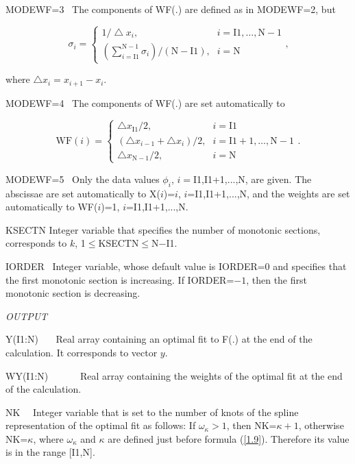 \documentclass[acmtoms]{acmtrans2m}
\begin{document}
\qquad MODEWF=3 \ The components of WF(.) are defined as in MODEWF=2, but

\begin{equation}
\sigma _{i}=\left\{ 
\begin{array}{ll}
1/\bigtriangleup x_{i}\text{,} & i=\text{I1},\ldots ,\text{N}-1 \\ 
\left( \sum_{i=\text{I1}}^{\text{N}-1}\sigma _{i}\right) /(\text{N}-\text{I1}%
)\text{,} & i=\text{N}
\end{array}
\right. \text{,}  \label{2.3}
\end{equation}

where $\bigtriangleup x_{i}=x_{i+1}-x_{i}$.

\qquad MODEWF=4 \ The components of WF(.) are set automatically to

\begin{equation}
\text{WF}(i)=\left\{ 
\begin{array}{ll}
\bigtriangleup x_{\text{I1}}/2\text{,} & i=\text{I1} \\ 
(\bigtriangleup x_{i-1}+\bigtriangleup x_{i})/2\text{,} & i=\text{I}%
1+1,\ldots ,\text{N}-1 \\ 
\bigtriangleup x_{\text{N}-1}/2\text{,} & i=\text{N}
\end{array}
\right. \text{.}  \label{2.4}
\end{equation}

\qquad MODEWF=5 \ Only the data values $\phi _{i}$, $i=$I1,I1+1,...,N, are
given. The abscissae are set automatically to X($i$)=$i$, $i$=I1,I1+1,...,N,
and the weights are set automatically to WF($i$)=1, $i$=I1,I1+1,...,N.

KSECTN \qquad Integer variable that specifies the number of monotonic
sections, corresponds to $k$, 1$\leq $KSECTN$\leq $N$-$I1.

IORDER \qquad\ Integer variable, whose default value is IORDER=0 and
specifies that the first monotonic section is increasing. If IORDER=$-1$,
then the first monotonic section is decreasing.

\bigskip

\textit{OUTPUT }

Y(I1:N) \qquad\ \ \ Real array containing an optimal fit to F(.) at the end
of the calculation. It corresponds to vector $y$.

WY(I1:N) \ \ \ \ \ \ Real array containing the weights of the optimal fit at
the end of the calculation.

NK \qquad \qquad\ \ Integer variable that is set to the number of knots of
the spline representation of the optimal fit as follows: If $\omega _{\kappa
}>1$, then NK=$\kappa +1$, otherwise NK=$\kappa $, where $\omega _{\kappa }$
and $\kappa $ are defined just before formula (\ref{1.9}). Therefore its
value is in the range [I1,N].
\end{document}
